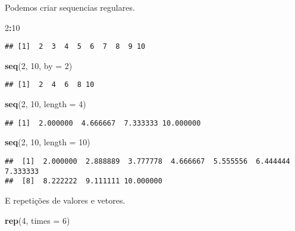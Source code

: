 \documentclass[
]{book}
\newenvironment{Shaded}{\begin{snugshade}}{\end{snugshade}}
\newcommand{\DataTypeTok}[1]{\textcolor[rgb]{0.13,0.29,0.53}{#1}}
\newcommand{\DecValTok}[1]{\textcolor[rgb]{0.00,0.00,0.81}{#1}}
\newcommand{\KeywordTok}[1]{\textcolor[rgb]{0.13,0.29,0.53}{\textbf{#1}}}
\newcommand{\NormalTok}[1]{#1}
\newcommand{\OperatorTok}[1]{\textcolor[rgb]{0.81,0.36,0.00}{\textbf{#1}}}
\begin{document}
Podemos criar sequencias regulares.

\begin{Shaded}
\begin{Highlighting}[]
\DecValTok{2}\OperatorTok{:}\DecValTok{10}
\end{Highlighting}
\end{Shaded}

\begin{verbatim}
## [1]  2  3  4  5  6  7  8  9 10
\end{verbatim}

\begin{Shaded}
\begin{Highlighting}[]
\KeywordTok{seq}\NormalTok{(}\DecValTok{2}\NormalTok{, }\DecValTok{10}\NormalTok{, }\DataTypeTok{by =} \DecValTok{2}\NormalTok{)}
\end{Highlighting}
\end{Shaded}

\begin{verbatim}
## [1]  2  4  6  8 10
\end{verbatim}

\begin{Shaded}
\begin{Highlighting}[]
\KeywordTok{seq}\NormalTok{(}\DecValTok{2}\NormalTok{, }\DecValTok{10}\NormalTok{, }\DataTypeTok{length =} \DecValTok{4}\NormalTok{)}
\end{Highlighting}
\end{Shaded}

\begin{verbatim}
## [1]  2.000000  4.666667  7.333333 10.000000
\end{verbatim}

\begin{Shaded}
\begin{Highlighting}[]
\KeywordTok{seq}\NormalTok{(}\DecValTok{2}\NormalTok{, }\DecValTok{10}\NormalTok{, }\DataTypeTok{length =} \DecValTok{10}\NormalTok{)}
\end{Highlighting}
\end{Shaded}

\begin{verbatim}
##  [1]  2.000000  2.888889  3.777778  4.666667  5.555556  6.444444  7.333333
##  [8]  8.222222  9.111111 10.000000
\end{verbatim}

E repetições de valores e vetores.

\begin{Shaded}
\begin{Highlighting}[]
\KeywordTok{rep}\NormalTok{(}\DecValTok{4}\NormalTok{, }\DataTypeTok{times =} \DecValTok{6}\NormalTok{)}
\end{Highlighting}
\end{Shaded}
\end{document}
